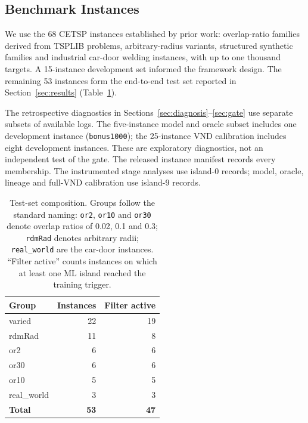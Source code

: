 \documentclass[a4paper,fleqn]{cas-dc}
\begin{document}

\subsection{Benchmark Instances}\label{sec:setup-instances}

We use the 68 CETSP instances established by prior work: overlap-ratio families
derived from TSPLIB problems, arbitrary-radius variants, structured synthetic
families and industrial car-door welding instances, with up to one thousand
targets. A 15-instance development set informed the framework design. The
remaining 53 instances form the end-to-end test set reported in
Section~\ref{sec:results} (Table~\ref{tab:instances}).

The retrospective diagnostics in Sections~\ref{sec:diagnosis}--\ref{sec:gate}
use separate subsets of available logs. The five-instance model and oracle subset
includes one development instance (\texttt{bonus1000}); the 25-instance VND
calibration includes eight development instances. These are exploratory
diagnostics, not an independent test of the gate. The released instance manifest
records every membership. The instrumented stage analyses use island-0 records;
model, oracle, lineage and full-VND calibration use island-9 records.

\begin{table}[htbp]
\caption{Test-set composition. Groups follow the standard naming: \texttt{or2},
\texttt{or10} and \texttt{or30} denote overlap ratios of 0.02, 0.1 and 0.3;
\texttt{rdmRad} denotes arbitrary radii; \texttt{real\_world} are the car-door
instances. ``Filter active'' counts instances on which at least one ML island
reached the training trigger.}
\label{tab:instances}
\centering\small
\begin{tabular}{lrr}
\toprule
Group & Instances & Filter active \\
\midrule
varied      & 22 & 19 \\
rdmRad      & 11 &  8 \\
or2         &  6 &  6 \\
or30        &  6 &  6 \\
or10        &  5 &  5 \\
real\_world &  3 &  3 \\
\midrule
\textbf{Total} & \textbf{53} & \textbf{47} \\
\bottomrule
\end{tabular}
\end{table}
\end{document}
